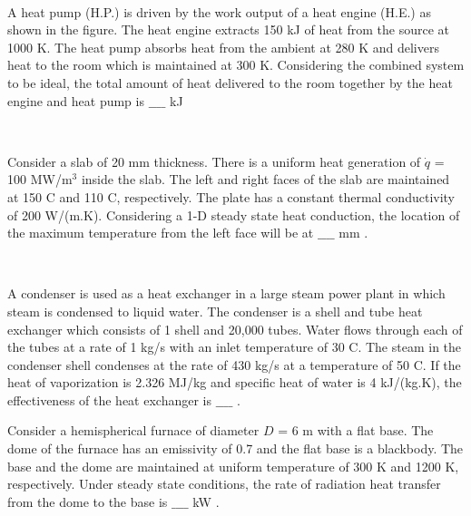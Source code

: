 \begin{figure}[!ht]
\centering
\resizebox{0.5\textwidth}{!}{%

}%
\end{figure}\\
\item A heat pump (H.P.) is driven by the work output of a heat engine (H.E.) as shown in the figure. The heat engine extracts 150 kJ of heat from the source at 1000 K. The heat pump absorbs heat from the ambient at 280 K and delivers heat to the room which is maintained at 300 K. Considering the combined system to be ideal, the total amount of heat delivered to the room together by the heat engine and heat pump is $\_\_\_\_$ kJ 
\begin{figure}[!ht]
\centering
\resizebox{0.5\textwidth}{!}{%

}%
\end{figure}\\
\item Consider a slab of 20 mm thickness. There is a uniform heat generation of
$\dot{q}$ = 100 MW/$\text{m}^3$ inside the slab. The left and right faces of the slab are maintained at 150 \degree C and 110 \degree C, respectively. The plate has a constant thermal conductivity of 200 W/(m.K). Considering a 1-D steady state heat conduction, the location of the maximum temperature from the left face will be at $\_\_\_\_$ mm .
\begin{figure}[!ht]
\centering
\resizebox{0.5\textwidth}{!}{%

}%
\end{figure}\\ 
\item A condenser is used as a heat exchanger in a large steam power plant in which steam is condensed to liquid water. The condenser is a shell and tube heat exchanger which consists of 1 shell and 20,000 tubes. Water flows through each of the tubes at a rate of 1 kg/s with an inlet temperature of 30 \degree C. The steam in the condenser shell condenses at the rate of 430 kg/s at a temperature of 50 \degree C. If the heat of vaporization is 2.326 MJ/kg and specific heat of water is 4 kJ/(kg.K), the effectiveness of the heat exchanger is $\_\_\_\_$ . \\
\item Consider a hemispherical furnace of diameter $D$ = 6 m with a flat base. The dome of the furnace has an emissivity of 0.7 and the flat base is a blackbody. The base and the dome are maintained at uniform temperature of 300 K and 1200 K, respectively. Under steady state conditions, the rate of radiation heat transfer from the dome to the base is $\_\_\_\_$ kW . \\\\
